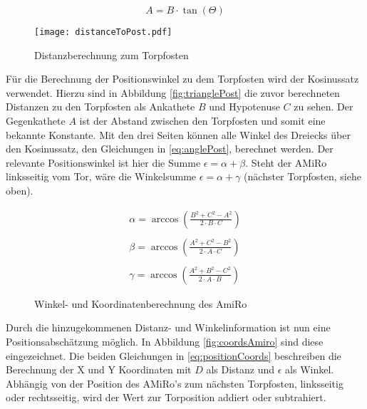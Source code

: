 \begin{equation}
	A = B \cdot \tan(\Theta)
	\label{eq:distanceToPost}
\end{equation}

\begin{figure}[h]
	\begin{center}
		\texttt{[image: distanceToPost.pdf]} 	
		\caption{Distanzberechnung zum Torpfosten}
		\label{fig:distToPost}
	\end{center}
\end{figure}

Für die Berechnung der Positionswinkel zu dem Torpfosten wird der Kosinussatz verwendet. Hierzu sind in Abbildung \ref{fig:trianglePost} die zuvor berechneten Distanzen zu den Torpfosten als Ankathete $B$ und Hypotenuse $C$ zu sehen. Der Gegenkathete $A$ ist der Abstand zwischen den Torpfosten und somit eine bekannte Konstante. Mit den drei Seiten können alle Winkel des Dreiecks über den Kosinussatz, den Gleichungen in \ref{eq:anglePost}, berechnet werden. Der relevante Positionswinkel ist hier die Summe $\epsilon = \alpha + \beta$. Steht der AMiRo linksseitig vom Tor, wäre die Winkelsumme $\epsilon = \alpha + \gamma$ (nächster Torpfosten, siehe oben). 

\begin{equation}
	\begin{aligned}
		\alpha = \arccos(\frac{B^2 + C^2 - A^2}{2 \cdot B \cdot C}) \\\\
		\beta = \arccos(\frac{A^2 + C^2 - B^2}{2 \cdot A \cdot C}) \\\\
		\gamma = \arccos(\frac{A^2 + B^2 - C^2}{2 \cdot A \cdot B})
		\label{eq:anglePost}
	\end{aligned}
\end{equation}

\begin{figure} []
	 \hspace{2cm}
	\caption{Winkel- und Koordinatenberechnung des AmiRo} 
	\label{fig:triangleAndCoordsPost}
\end{figure}

Durch die hinzugekommenen Distanz- und Winkelinformation ist nun eine Positionsabschätzung möglich. In Abbildung \ref{fig:coordsAmiro} sind diese eingezeichnet. Die beiden Gleichungen in \ref{eq:positionCoords} beschreiben die Berechnung der X und Y Koordinaten mit $D$ als Distanz und $\epsilon$ als Winkel. Abhängig von der Position des AMiRo's zum nächsten Torpfosten, linksseitig oder rechtsseitig, wird der Wert zur Torposition addiert oder subtrahiert.

